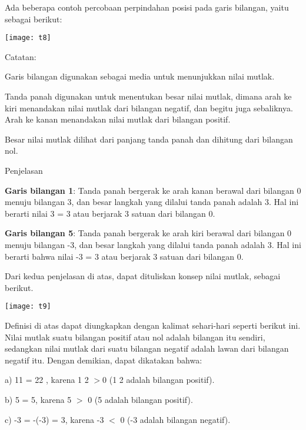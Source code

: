 \documentclass[11pt,fleqn]{book} %
\begin{document}
 Ada beberapa contoh percobaan perpindahan posisi pada garis bilangan, yaitu sebagai berikut:

  \texttt{[image: t8]}

\noindent Catatan: 

\noindent  Garis bilangan digunakan sebagai media untuk menunjukkan nilai mutlak. 

\noindent  Tanda panah digunakan untuk menentukan besar nilai mutlak, dimana arah ke kiri menandakan nilai mutlak dari bilangan negatif, dan begitu juga sebaliknya. Arah ke kanan menandakan nilai mutlak dari bilangan positif. 

\noindent  Besar nilai mutlak dilihat dari panjang tanda panah dan dihitung dari bilangan nol.

\noindent 

\noindent Penjelasan 

\noindent \textbf{Garis bilangan 1}: Tanda panah bergerak ke arah kanan berawal dari bilangan 0 menuju bilangan 3, dan besar langkah yang dilalui tanda panah adalah 3. Hal ini berarti nilai {\textbar}3{\textbar} = 3 atau berjarak 3 satuan dari bilangan 0. 

\noindent \textbf{Garis bilangan 5}: Tanda panah bergerak ke arah kiri berawal dari bilangan 0 menuju bilangan -3, dan besar langkah yang dilalui tanda panah adalah 3. Hal ini berarti bahwa nilai {\textbar}-3{\textbar} = 3 atau berjarak 3 satuan dari bilangan 0.

  Dari kedua penjelasan di atas, dapat dituliskan konsep nilai mutlak, sebagai berikut.

\noindent 

   \texttt{[image: t9]}

\noindent 

  Definisi di atas dapat diungkapkan dengan kalimat sehari-hari seperti berikut ini. Nilai mutlak suatu bilangan positif atau nol adalah bilangan itu sendiri, sedangkan nilai mutlak dari suatu bilangan negatif adalah lawan dari bilangan negatif itu. Dengan demikian, dapat dikatakan bahwa:

\noindent  a) 11 = 22 , karena 1 2 $>$0 (1 2 adalah bilangan positif). 

\noindent b) {\textbar}5{\textbar} = 5, karena 5 $>$ 0 (5 adalah bilangan positif).

\noindent  c) {\textbar}-3{\textbar} = -(-3) = 3, karena -3 $<$ 0 (-3 adalah bilangan negatif).
\end{document}
